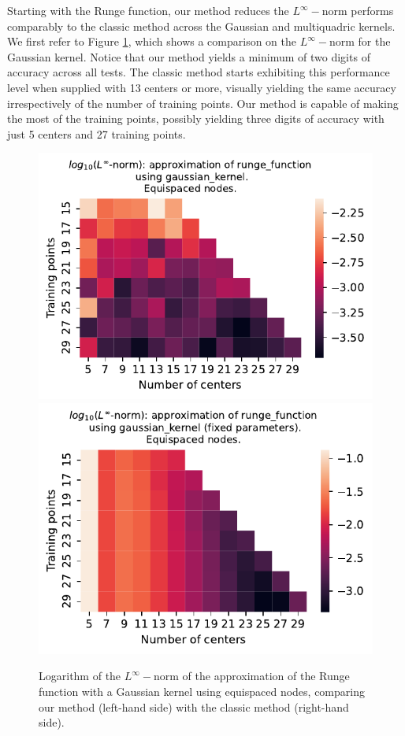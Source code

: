\documentclass[12pt]{report} %
\begin{document}
Starting with the Runge function, our method reduces the
$L^{\infty} -$norm performs comparably to the classic method across the Gaussian and multiquadric kernels. 
We first refer to Figure \ref{fig:runge-gaussian-comparison-methods}, which shows a comparison on the $L^\infty-$norm for the Gaussian kernel. Notice that our method yields a minimum of two digits of accuracy across all tests. The classic method starts exhibiting this performance level when supplied with 13
centers or more, visually yielding the same accuracy irrespectively of the number of training points. Our method is capable of making the most of the training points, possibly yielding three digits of accuracy with just 5 centers and 27 training points. %

\begin{figure}[ht]
    \centering
    
    \includegraphics[width=.49\textwidth]{imagenes/experiments/1d/variational/runge_function-Kgaussian_kernel-Equi.pdf}
    \includegraphics[width=.49\textwidth]{imagenes/experiments/1d/least_squares/opt-runge_function-Kgaussian_kernel-Equi.pdf}
    \caption{Logarithm of the $L^\infty-$norm of the approximation of the Runge function with a Gaussian kernel using equispaced nodes, comparing our method (left-hand side) with the classic method (right-hand side).}
    \label{fig:runge-gaussian-comparison-methods}
\end{figure}
\end{document}
